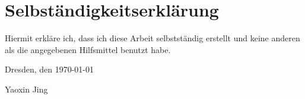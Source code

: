  

\section*{\vfill{} \thispagestyle{empty}
Selbständigkeitserklärung}

Hiermit erkläre ich, dass ich diese Arbeit selbstständig erstellt
und keine anderen als die angegebenen Hilfsmittel benutzt habe.
\bigskip{}

\noindent Dresden, den \today %
\vspace{2.5cm}

\noindent Yaoxin Jing {}
